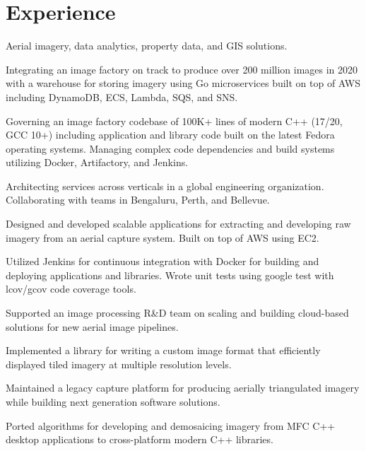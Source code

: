 \documentclass[letterpaper]{fowles-resume} %
\begin{document}
\begin{minipage}[t]{0.66\textwidth} %


\section{Experience}
Aerial imagery, data analytics, property data, and GIS solutions. 
\vspace{\topsep}
\begin{tightitemize}
\item Integrating an image factory on track to produce over 200 million images in 2020 with a warehouse for storing imagery using Go microservices built on top of AWS including DynamoDB, ECS, Lambda, SQS, and SNS.
\item Governing an image factory codebase of 100K+ lines of modern C++ (17/20, GCC 10+) including application and library code built on the latest Fedora operating systems. Managing complex code dependencies and build systems utilizing Docker, Artifactory, and Jenkins.
\item Architecting services across verticals in a global engineering organization. Collaborating with teams in Bengaluru, Perth, and Bellevue.
\end{tightitemize}
\begin{tightitemize}
\item Designed and developed scalable applications for extracting and developing raw imagery from an aerial capture system. Built on top of AWS using EC2. 
\item Utilized Jenkins for continuous integration with Docker for building and deploying applications and libraries. Wrote unit tests using google test with lcov/gcov code coverage tools.
\end{tightitemize}
\begin{tightitemize}
\item Supported an image processing R\&D team on scaling and building cloud-based solutions for new aerial image pipelines.
\item Implemented a library for writing a custom image format that efficiently displayed tiled imagery at multiple resolution levels.
\end{tightitemize}
\begin{tightitemize}
\item Maintained a legacy capture platform for producing aerially triangulated imagery while building next generation software solutions.
\item Ported algorithms for developing and demosaicing imagery from MFC C++ desktop applications to cross-platform modern C++ libraries. 
\end{tightitemize}


\end{minipage}
\end{document}
